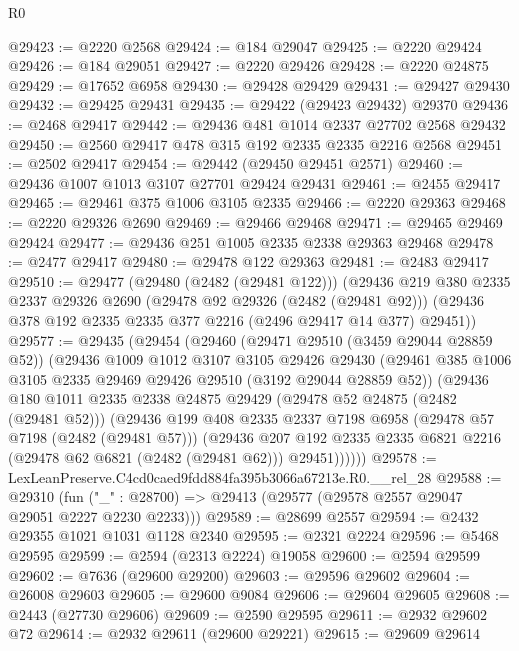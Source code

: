\begin{lexlean}{R0}
\begin{coremodule}
@29423 := @2220 @2568
@29424 := @184 @29047
@29425 := @2220 @29424
@29426 := @184 @29051
@29427 := @2220 @29426
@29428 := @2220 @24875
@29429 := @17652 @6958
@29430 := @29428 @29429
@29431 := @29427 @29430
@29432 := @29425 @29431
@29435 := @29422 (@29423 @29432) @29370
@29436 := @2468 @29417
@29442 := @29436 @481 @1014 @2337 @27702 @2568 @29432
@29450 := @2560 @29417 @478 @315 @192 @2335 @2335 @2216 @2568
@29451 := @2502 @29417
@29454 := @29442 (@29450 @29451 @2571)
@29460 := @29436 @1007 @1013 @3107 @27701 @29424 @29431
@29461 := @2455 @29417
@29465 := @29461 @375 @1006 @3105 @2335
@29466 := @2220 @29363
@29468 := @2220 @29326 @2690
@29469 := @29466 @29468
@29471 := @29465 @29469 @29424
@29477 := @29436 @251 @1005 @2335 @2338 @29363 @29468
@29478 := @2477 @29417
@29480 := @29478 @122 @29363
@29481 := @2483 @29417
@29510 := @29477
    (@29480 (@2482 (@29481 @122)))
    (@29436
      @219
      @380
      @2335
      @2337
      @29326
      @2690
      (@29478 @92 @29326 (@2482 (@29481 @92)))
      (@29436 @378 @192 @2335 @2335 @377 @2216 (@2496 @29417 @14 @377) @29451))
@29577 := @29435
    (@29454
      (@29460
        (@29471 @29510 (@3459 @29044 @28859 @52))
        (@29436
          @1009
          @1012
          @3107
          @3105
          @29426
          @29430
          (@29461 @385 @1006 @3105 @2335 @29469 @29426 @29510 (@3192 @29044 @28859 @52))
          (@29436
            @180
            @1011
            @2335
            @2338
            @24875
            @29429
            (@29478 @52 @24875 (@2482 (@29481 @52)))
            (@29436
              @199
              @408
              @2335
              @2337
              @7198
              @6958
              (@29478 @57 @7198 (@2482 (@29481 @57)))
              (@29436
                @207
                @192
                @2335
                @2335
                @6821
                @2216
                (@29478 @62 @6821 (@2482 (@29481 @62)))
                @29451))))))
@29578 := LexLeanPreserve.C4cd0caed9fdd884fa395b3066a67213e.R0.__rel_28
@29588 := @29310
    (fun ("_" : @28700) => @29413 (@29577 (@29578 @2557 @29047 @29051 @2227 @2230 @2233)))
@29589 := @28699 @2557
@29594 := @2432 @29355 @1021 @1031 @1128 @2340
@29595 := @2321 @2224
@29596 := @5468 @29595
@29599 := @2594 (@2313 @2224) @19058
@29600 := @2594 @29599
@29602 := @7636 (@29600 @29200)
@29603 := @29596 @29602
@29604 := @26008 @29603
@29605 := @29600 @9084
@29606 := @29604 @29605
@29608 := @2443 (@27730 @29606)
@29609 := @2590 @29595
@29611 := @2932 @29602 @72
@29614 := @2932 @29611 (@29600 @29221)
@29615 := @29609 @29614

\end{coremodule}
\end{lexlean}
